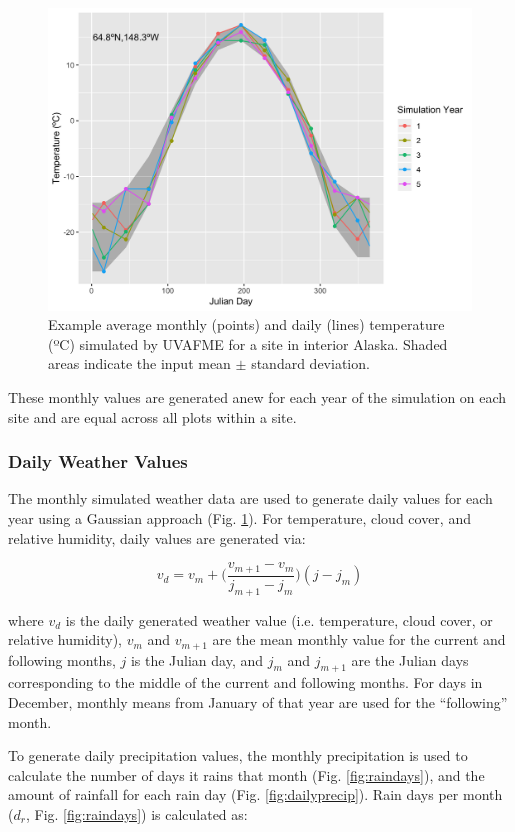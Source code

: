 \documentclass[a4paper, 12pt] {report}
\begin{document}
\begin{figure}
  \includegraphics[width=0.78\linewidth]{Figures/Temperature_Daily.png}
  \caption{Example average monthly (points) and daily (lines) temperature (ºC) simulated by UVAFME for a site in interior Alaska. Shaded areas indicate the input mean $\pm$ standard deviation.}
  \label{fig:dailytemp}
\end{figure}

These monthly values are generated anew for each year of the simulation on each site and are equal across all plots within a site.

\subsubsection{Daily Weather Values}

The monthly simulated weather data are used to generate daily values for each year using a Gaussian approach (Fig. \ref{fig:dailytemp}). For temperature, cloud cover, and relative humidity, daily values are generated via:

\begin{equation}
v_d = v_m + \Big(\frac{v_{m+1} - v_m}{j_{m+1}-j_m}\Big)(j - j_m)
\end{equation}

where $v_d$ is the daily generated weather value (i.e. temperature, cloud cover, or relative humidity), $v_{m}$ and $v_{m+1}$ are the mean monthly value for the current and following months, $j$ is the Julian day, and $j_m$ and $j_{m+1}$ are the Julian days corresponding to the middle of the current and following months. For days in December, monthly means from January of that year are used for the ``following'' month.

To generate daily precipitation values, the monthly precipitation is used to calculate the number of days it rains that month (Fig. \ref{fig:raindays}), and the amount of rainfall for each rain day (Fig. \ref{fig:dailyprecip}). Rain days per month ($d_r$, Fig. \ref{fig:raindays}) is calculated as:
\end{document}
